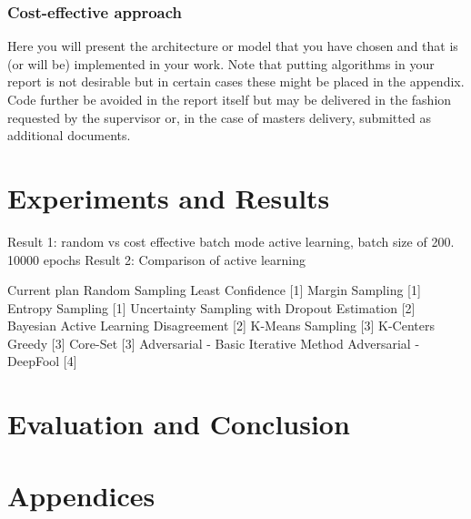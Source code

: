 \subsection{Cost-effective approach}



Here you will present the architecture or model that you have chosen and that is (or will be) implemented in your work. Note that putting algorithms in your report is not desirable but in certain cases these might be placed in the appendix. Code further be avoided in the report itself but may be delivered in the fashion requested by the supervisor or, in the case of masters delivery, submitted as additional documents. 

\chapter{Experiments and Results}
\label{cha:ResearchAndResults}

Result 1: random vs cost effective batch mode active learning, batch size of 200. 10000 epochs 
Result 2: Comparison of active learning 

Current plan
Random Sampling
Least Confidence [1]
Margin Sampling [1]
Entropy Sampling [1]
Uncertainty Sampling with Dropout Estimation [2]
Bayesian Active Learning Disagreement [2]
K-Means Sampling [3]
K-Centers Greedy [3]
Core-Set [3]
Adversarial - Basic Iterative Method
Adversarial - DeepFool [4]




\chapter{Evaluation and Conclusion}
\label{cha:evaluationAndConclusion}




\backmatter



\chapter{Appendices}
\label{cha:appendices}



